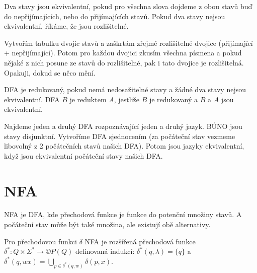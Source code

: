 \documentclass[12pt]{article}                   %
\begin{document}
    \begin{definice}
        Dva stavy jsou ekvivalentní, pokud pro všechna slova dojdeme z obou stavů buď do nepřijímajících, nebo do přijímajících stavů. Pokud dva stavy nejsou ekvivalentní, říkáme, že jsou rozlišitelné.
    \end{definice}

    \begin{poznamka}
        Vytvořím tabulku dvojic stavů a zaškrtám zřejmě rozlišitelné dvojice (přijímající + nepřijímající). Potom pro každou dvojici zkusím všechna písmena a pokud nějaké z nich posune ze stavů do rozlišitelné, pak i tato dvojice je rozlišitelná. Opakuji, dokud se něco mění.
    \end{poznamka}

    \begin{definice}
        DFA je redukovaný, pokud nemá nedosažitelné stavy a žádné dva stavy nejsou ekvivalentní. DFA $B$ je reduktem $A$, jestliže $B$ je redukovaný a $B$ a $A$ jsou ekvivalentní.
    \end{definice}


    \begin{poznamka}
        Najdeme jeden a druhý DFA rozpoznávající jeden a druhý jazyk. BÚNO jsou stavy disjunktní. Vytvoříme DFA sjednocením (za počáteční stav vezmeme libovolný z 2 počátečních stavů našich DFA). Potom jsou jazyky ekvivalentní, když jsou ekvivalentní počáteční stavy našich DFA.
    \end{poznamka}
    
\section{NFA}

    \begin{definice}
        NFA je DFA, kde přechodová funkce je funkce do potenční množiny stavů. A počáteční stav může být také množina, ale existují obě alternativy.
    \end{definice}

    \begin{definice}
        Pro přechodovou funkci $\delta$ NFA je rozšířená přechodová funkce $\delta^*: Q\times \Sigma^* \rightarrow ©P(Q)$ definovaná indukcí: $\delta^*(q, \lambda) = \{q\}$ a $\delta^*(q, wx) = \bigcup_{p \in \delta^*(q, w)}\delta(p, x)$.
    \end{definice}
\end{document}
